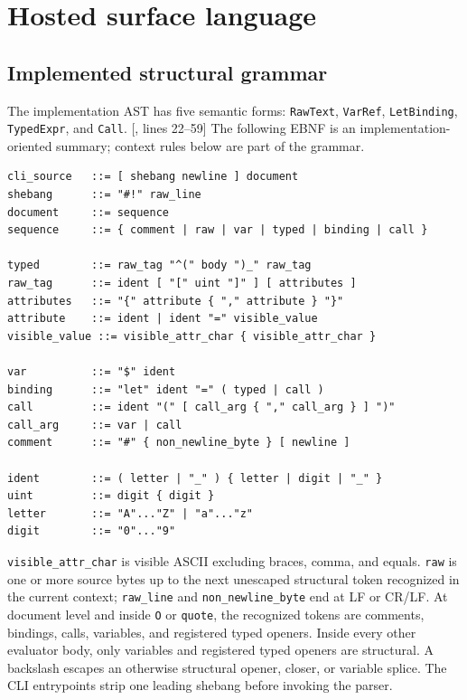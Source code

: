\documentclass[11pt,oneside]{article}
\newcommand{\src}[2]{\textcolor{OSlate}{\scriptsize[\path{#1}, lines #2]}\allowbreak}
\begin{document}
\section{Hosted surface language}
\label{sec:syntax}

\subsection{Implemented structural grammar}

The implementation AST has five semantic forms:
\texttt{RawText}, \texttt{VarRef}, \texttt{LetBinding},
\texttt{TypedExpr}, and \texttt{Call}. \src{crates/ostadix-api/src/parser.rs}{22--59}
The following EBNF is an implementation-oriented summary; context rules below
are part of the grammar.

\begin{lstlisting}[style=plaincode]
cli_source   ::= [ shebang newline ] document
shebang      ::= "#!" raw_line
document     ::= sequence
sequence     ::= { comment | raw | var | typed | binding | call }

typed        ::= raw_tag "^(" body ")_" raw_tag
raw_tag      ::= ident [ "[" uint "]" ] [ attributes ]
attributes   ::= "{" attribute { "," attribute } "}"
attribute    ::= ident | ident "=" visible_value
visible_value ::= visible_attr_char { visible_attr_char }

var          ::= "$" ident
binding      ::= "let" ident "=" ( typed | call )
call         ::= ident "(" [ call_arg { "," call_arg } ] ")"
call_arg     ::= var | call
comment      ::= "#" { non_newline_byte } [ newline ]

ident        ::= ( letter | "_" ) { letter | digit | "_" }
uint         ::= digit { digit }
letter       ::= "A"..."Z" | "a"..."z"
digit        ::= "0"..."9"
\end{lstlisting}

\texttt{visible\_attr\_char} is visible ASCII excluding braces, comma, and
equals. \texttt{raw} is one or more source bytes up to the next unescaped
structural token recognized in the current context; \texttt{raw\_line} and
\texttt{non\_newline\_byte} end at LF or CR/LF. At document level and inside
\texttt{O} or \texttt{quote}, the recognized tokens are comments, bindings,
calls, variables, and registered typed openers. Inside every other evaluator
body, only variables and registered typed openers are structural. A backslash
escapes an otherwise structural opener, closer, or variable splice. The CLI
entrypoints strip one leading shebang before invoking the parser.
\end{document}
